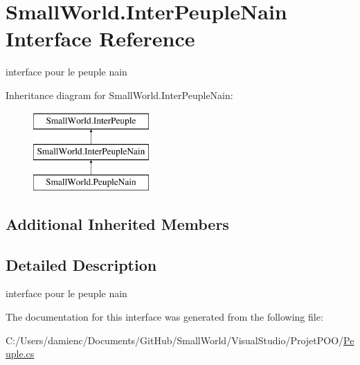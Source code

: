 \hypertarget{interface_small_world_1_1_inter_peuple_nain}{\section{Small\-World.\-Inter\-Peuple\-Nain Interface Reference}
\label{interface_small_world_1_1_inter_peuple_nain}
}


interface pour le peuple nain  


Inheritance diagram for Small\-World.\-Inter\-Peuple\-Nain\-:\begin{figure}[H]
\begin{center}
\leavevmode
\includegraphics[height=3.000000cm]{interface_small_world_1_1_inter_peuple_nain}
\end{center}
\end{figure}
\subsection*{Additional Inherited Members}


\subsection{Detailed Description}
interface pour le peuple nain 

The documentation for this interface was generated from the following file\-:\begin{DoxyCompactItemize}
\item 
C\-:/\-Users/damienc/\-Documents/\-Git\-Hub/\-Small\-World/\-Visual\-Studio/\-Projet\-P\-O\-O/\hyperlink{_peuple_8cs}{Peuple.\-cs}\end{DoxyCompactItemize}
